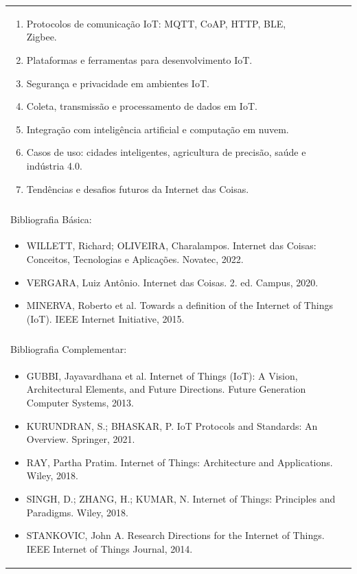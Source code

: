 \documentclass[11pt]{article}
\begin{document}
\begin{center}
\begin{longtable}{|p{4cm}|p{4cm}|p{4cm}|p{4cm}|}
{\begin{enumerate}
\item Protocolos de comunicação IoT: MQTT, CoAP, HTTP, BLE, Zigbee.
\item Plataformas e ferramentas para desenvolvimento IoT.
\item Segurança e privacidade em ambientes IoT.
\item Coleta, transmissão e processamento de dados em IoT.
\item Integração com inteligência artificial e computação em nuvem.
\item Casos de uso: cidades inteligentes, agricultura de precisão, saúde e indústria 4.0.
\item Tendências e desafios futuros da Internet das Coisas.\end{enumerate}}\\
\multicolumn{4}{|p{16cm}|}{}\\
\hline
\multicolumn{4}{|p{16cm}|}{Bibliografia Básica:}\\
\multicolumn{4}{|p{16cm}|}{%
\begin{itemize}\item WILLETT, Richard; OLIVEIRA, Charalampos. Internet das Coisas: Conceitos, Tecnologias e Aplicações. Novatec, 2022.
\item VERGARA, Luiz Antônio. Internet das Coisas. 2. ed. Campus, 2020.
\item MINERVA, Roberto et al. Towards a definition of the Internet of Things (IoT). IEEE Internet Initiative, 2015.\end{itemize}}\\
\multicolumn{4}{|p{16cm}|}{}\\
\hline
\multicolumn{4}{|p{16cm}|}{Bibliografia Complementar:}\\
\multicolumn{4}{|p{16cm}|}{%
\begin{itemize}\item GUBBI, Jayavardhana et al. Internet of Things (IoT): A Vision, Architectural Elements, and Future Directions. Future Generation Computer Systems, 2013.
\item KURUNDRAN, S.; BHASKAR, P. IoT Protocols and Standards: An Overview. Springer, 2021.
\item RAY, Partha Pratim. Internet of Things: Architecture and Applications. Wiley, 2018.
\item SINGH, D.; ZHANG, H.; KUMAR, N. Internet of Things: Principles and Paradigms. Wiley, 2018.
\item STANKOVIC, John A. Research Directions for the Internet of Things. IEEE Internet of Things Journal, 2014.\end{itemize}}\\
\hline
\end{longtable}
\end{center}
\end{document}
